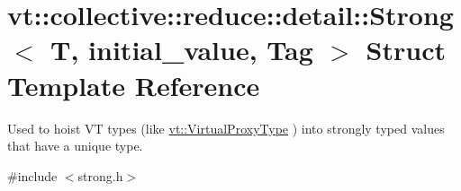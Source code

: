 \hypertarget{structvt_1_1collective_1_1reduce_1_1detail_1_1_strong}{}\section{vt\+:\+:collective\+:\+:reduce\+:\+:detail\+:\+:Strong$<$ T, initial\+\_\+value, Tag $>$ Struct Template Reference}
\label{structvt_1_1collective_1_1reduce_1_1detail_1_1_strong}


Used to hoist VT types (like {\ttfamily \hyperlink{namespacevt_a1b417dd5d684f045bb58a0ede70045ac}{vt\+::\+Virtual\+Proxy\+Type}} ) into strongly typed values that have a unique type.  




{\ttfamily \#include $<$strong.\+h$>$}

